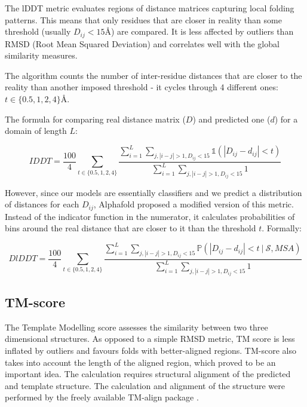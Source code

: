 The lDDT metric evaluates regions of distance matrices capturing local folding patterns. This means that only residues that are closer in reality than some threshold (usually $D_{ij} < 15$\AA) are compared. It is less affected by outliers than RMSD (Root Mean Squared Deviation) and correlates well with the global similarity measures.

The algorithm counts the number of inter-residue distances that are closer to the reality than another imposed threshold - it cycles through 4 different ones: $t \in \{0.5, 1, 2, 4\}$\AA \cite{lddt}.

The formula for comparing real distance matrix ($D$) and predicted one ($d$) for a domain of length $L$:

$$IDDT = \frac{100}{4} \sum_{t \in \{0.5, 1, 2, 4\}} \frac
{\sum_{i = 1}^L \sum_{j, |i - j| > 1, D_{ij} < 15} \mathds{1}(|D_{ij} - d_{ij}| < t)}
{\sum_{i = 1}^L \sum_{j, |i - j| > 1, D_{ij} < 15} 1} $$

However, since our models are essentially classifiers and we predict a distribution of distances for each $D_{ij}$, Alphafold proposed a modified version of this metric. Instead of the indicator function in the numerator, it calculates probabilities of bins around the real distance that are closer to it than the threshold $t$. Formally:

\begin{equation}
DlDDT = \frac{100}{4} \sum_{t \in \{0.5, 1, 2, 4\}} \frac
{\sum_{i = 1}^L \sum_{j, |i - j| > 1, D_{ij} < 15} \mathds{P}(|D_{ij} - d_{ij}| < t~|~ \mathcal{S}, MSA)}
{\sum_{i = 1}^L \sum_{j, |i - j| > 1, D_{ij} < 15} 1}
    \label{eq:dlddt}
\end{equation}

\subsection{TM-score}

The Template Modelling score assesses the similarity between two three dimensional structures. As opposed to a simple RMSD metric, TM score is less inflated by outliers and favours folds with better-aligned regions. TM-score also takes into account the length of the aligned region, which proved to be an important idea. The calculation requires structural alignment of the predicted and template structure\cite{tmscore}. The calculation and alignment of the structure were performed by the freely available TM-align package \cite{tmalign}.


